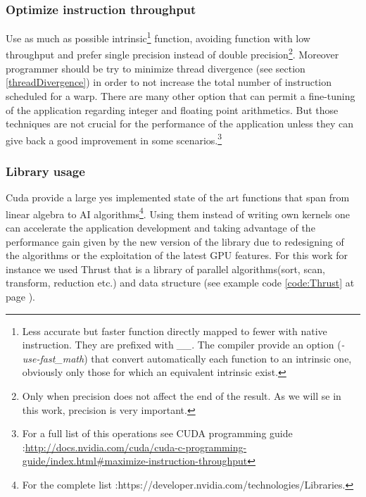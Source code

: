 \subsubsection{Optimize instruction throughput}
Use as much as possible intrinsic\footnote{Less accurate but faster function
directly mapped to fewer with native instruction. They are prefixed with
\emph{\_\_}. The compiler provide an option (\emph{-use-fast\_math}) that
convert automatically each function to an intrinsic one, obviously only those for which an equivalent
intrinsic exist. } function, avoiding function with low throughput and
prefer single precision instead of double precision\footnote{Only when precision
does not affect the end of the result. As we will se in this work, precision is very important.}.
Moreover programmer should be try to minimize thread divergence (see section
\ref{threadDivergence}) in order to not increase the total number of
instruction scheduled for a warp.
There are many other option that can permit a fine-tuning of the application
regarding integer and floating point arithmetics. But those techniques are not
crucial for the performance of the application unless they can give
back a good improvement in some scenarios.\footnote{For a full list of this
operations see CUDA programming guide
:\url{http://docs.nvidia.com/cuda/cuda-c-programming-guide/index.html\#maximize-instruction-throughput}}



\subsubsection{Library usage}
Cuda provide a large yes implemented state of the art functions that span from
linear algebra to AI algorithms\footnote{For the
complete list :https://developer.nvidia.com/technologies/Libraries.}.
Using them instead of writing own kernels one can accelerate the application
development and taking advantage of the performance gain given by the new version of the library due to redesigning of the algorithms or the exploitation of the latest GPU features.
For this work for instance we used Thrust that is a library of parallel
algorithms(sort, scan, transform, reduction etc.) and data structure (see
example code \ref{code:Thrust} at page \pageref{code:Thrust}).



